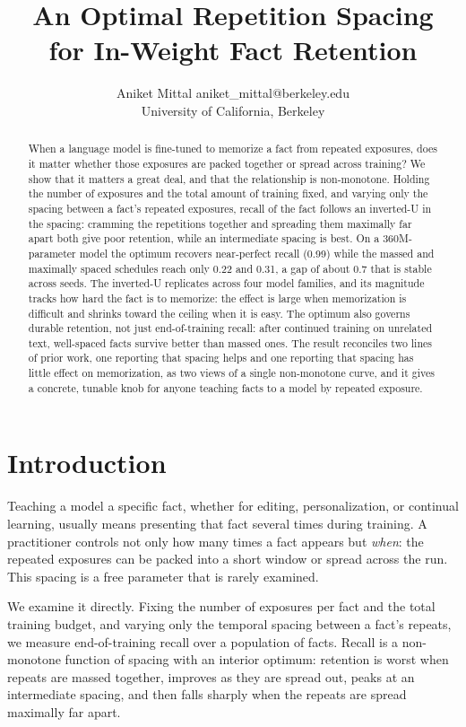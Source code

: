 \documentclass[10pt]{article}
\title{An Optimal Repetition Spacing\\ for In-Weight Fact Retention}
\author{\name Aniket Mittal \email aniket\_mittal@berkeley.edu \\
      \addr University of California, Berkeley}
\begin{document}
\maketitle

\begin{abstract}
When a language model is fine-tuned to memorize a fact from repeated exposures, does it matter
whether those exposures are packed together or spread across training? We show that it matters a
great deal, and that the relationship is non-monotone. Holding the number of exposures and the
total amount of training fixed, and varying only the spacing between a fact's repeated exposures,
recall of the fact follows an inverted-U in the spacing: cramming the repetitions together and
spreading them maximally far apart both give poor retention, while an intermediate spacing is best.
On a 360M-parameter model the optimum recovers near-perfect recall (0.99) while the massed and
maximally spaced schedules reach only 0.22 and 0.31, a gap of about 0.7 that is stable across seeds.
The inverted-U replicates across four model families, and its magnitude tracks how hard the fact is
to memorize: the effect is large when memorization is difficult and shrinks toward the ceiling when
it is easy. The optimum also governs durable retention, not just end-of-training recall: after
continued training on unrelated text, well-spaced facts survive better than massed ones. The result
reconciles two lines of prior work, one reporting that spacing helps and one reporting that spacing
has little effect on memorization, as two views of a single non-monotone curve, and it gives a
concrete, tunable knob for anyone teaching facts to a model by repeated exposure.
\end{abstract}

\section{Introduction}

Teaching a model a specific fact, whether for editing, personalization, or continual learning,
usually means presenting that fact several times during training. A practitioner controls not only
how many times a fact appears but \emph{when}: the repeated exposures can be packed into a short
window or spread across the run. This spacing is a free parameter that is rarely examined.

We examine it directly. Fixing the number of exposures per fact and the total training budget, and
varying only the temporal spacing between a fact's repeats, we measure end-of-training recall over
a population of facts. Recall is a non-monotone function of spacing with an interior optimum:
retention is worst when repeats are massed together, improves as they are spread out, peaks at an
intermediate spacing, and then falls sharply when the repeats are spread maximally far apart.
\end{document}
